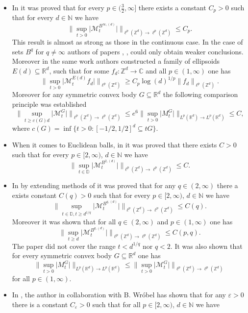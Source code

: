 \documentclass[10pt,a4paper]{amsart}
\numberwithin{equation}{section}
\newcommand{\Z}{\mathbb{Z}}
\newcommand{\R}{\mathbb{R}}
\newcommand{\C}{\mathbb{C}}
\newcommand{\D}{\mathbb{D}}
\newcommand{\N}{\mathbb{N}}
\begin{document}
\begin{itemize}
    \item In \cite{cubes} it was proved that for every $p \in ( \frac{3}{2}, \infty ]$ there exists a constant $C_p>0$ such that for every $d \in \N$ we have
    \[
    \Big\| \sup_{t>0} \big|\mathcal{M}_t^{B^{\infty,(d)}}\big| \Big\|_{\ell^p(\Z ^d) \to \ell^p(\Z ^d)} \leq C_p .
    \]
    This result is almost as strong as those in the continuous case. In the case of sets $B^q$ for $q \neq \infty$ authors of papers \cite{cubes}, \cite{balls}, \cite{KMPW}  could only obtain weaker conclusions. Moreover in the same work authors constructed a family of ellipsoids $E(d) \subseteq \R^d$, such that for some $f_d : \Z^d \to \C$ and all $p \in (1, \infty)$ one has 
    \[
     \Big\| \sup_{t>0} \big| \mathcal{M}_t^{E(d)} f_d \big| \Big\|_{\ell^p(\Z^d)} \ge C_p \log(d)^{1/p} \|f_d \|_{\ell^p(\Z^d)}.
    \]
    Moreover for any symmetric convex body $G \subseteq \R^d$ the following comparison principle was established
    \[
    \Big\| \sup_{t \ge c(G) d} \big| \mathcal{M}_t^G  \big| \Big\|_{\ell^p(\Z^d) \to \ell^p(\Z^d)} \le e^6 \Big\| \sup_{t>0} \big|M_t^G\big| \Big\|_{L^p(\R^d) \to L^p(\R^d) } \le C,
    \]
    where $c(G)= \inf\{t>0: [-1/2,1/2]^d \subseteq tG \}$.
    \item When it comes to Euclidean balls, in \cite{balls} it was proved that there exists $C>0$ such that for every $p \in [2, \infty)$, $d \in \N$ we have
    \[
    \Big\| \sup_{t \in \D} \big|\mathcal{M}_t^{B^{2,(d)}} \big| \Big\|_{\ell^p(\Z ^d) \to \ell^p(\Z ^d)} \leq C.
    \]
    \item In \cite{KMPW} by extending methods of \cite{balls}  it was proved that for any $q \in (2, \infty)$ there a exists constant $C(q)>0$ 
    such that for every $p \in [2, \infty)$, $d \in \N$ we have
    \[
    \Big\| \sup_{t \in \D, t \geq d^{1/q}} \big|\mathcal{M}_t^{B^{q,(d)}} \big| \Big\|_{\ell^p(\Z ^d) \to \ell^p(\Z ^d)} \leq C(q).
    \]
    Moreover it was shown that for all $q \in (2, \infty)$ and $p \in (1, \infty)$ one has 
    \[
    \Big\| \sup_{t \ge d} \big|\mathcal{M}_t^{B^{q,(d)}} \big| \Big\|_{\ell^p(\Z ^d) \to \ell^p(\Z ^d)} \leq C(p,q).
    \]
    The paper \cite{KMPW} did not cover the range $t<d^{1/q}$ nor $q<2$.
    It was also shown that for every symmetric convex body $G \subseteq \R^d$ one has
    \[
    \Big\| \sup_{t>0}\big|M_t^G\big| \Big\|_{L^p(\R^d) \to L^p(\R^d)} \le \Big\| \sup_{t>0}\big|\mathcal{M}_t^G\big| \Big\|_{\ell^p(\Z^d) \to \ell^p(\Z^d) }
    \]
    for all $p \in (1, \infty)$.
    \item  In \cite{NW}, the author in collaboration with B. Wróbel has shown that for any $\varepsilon>0$ there is a constant $C_{\varepsilon}>0$ such that for all $p \in [2,\infty)$, $d \in \N$ we have

\end{itemize}
\end{document}
